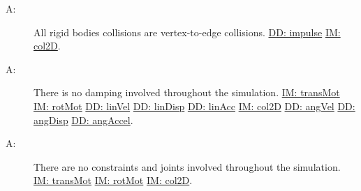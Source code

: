 \documentclass[12pt]{article}
\newcounter{assumpnum}
\newcommand{\atheassumpnum}{A\theassumpnum}
\begin{document}
\begin{description}
\item[\atheassumpnum\label{A:collisionType}:]All rigid bodies collisions are vertex-to-edge collisions. \hyperref[DD:impulse]{DD: impulse} \hyperref[IM:col2D]{IM: col2D}.
\end{description}
\begin{description}
\item[\atheassumpnum\label{A:dampingInvolvement}:]There is no damping involved throughout the simulation. \hyperref[IM:transMot]{IM: transMot} \hyperref[IM:rotMot]{IM: rotMot} \hyperref[DD:linVel]{DD: linVel} \hyperref[DD:linDisp]{DD: linDisp} \hyperref[DD:linAcc]{DD: linAcc} \hyperref[IM:col2D]{IM: col2D} \hyperref[DD:angVel]{DD: angVel} \hyperref[DD:angDisp]{DD: angDisp} \hyperref[DD:angAccel]{DD: angAccel}.
\end{description}
\begin{description}
\item[\atheassumpnum\label{A:constraintsAndJointsInvolvement}:]There are no constraints and joints involved throughout the simulation. \hyperref[IM:transMot]{IM: transMot} \hyperref[IM:rotMot]{IM: rotMot} \hyperref[IM:col2D]{IM: col2D}.
\end{description}
\end{document}
